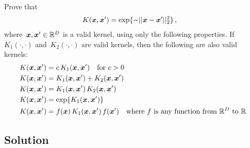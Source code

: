 \documentclass[submit]{harvardml}
\begin{document}
\newpage
\begin{problem}
Prove that
\begin{align*}
	K(\boldsymbol{x}, \boldsymbol{x}') &= \exp\{ -||\boldsymbol{x} - \boldsymbol{x}'||^2_2 \}\,,
\end{align*}
where~$\boldsymbol{x},\boldsymbol{x}'\in\mathbb{R}^D$ is a valid kernel, using only the following
properties.  If~$K_1(\cdot,\cdot)$ and~$K_2(\cdot,\cdot)$ are valid kernels,
then the following are also valid kernels:
\begin{align*}
	K(\boldsymbol{x}, \boldsymbol{x}') &= c\,K_1(\boldsymbol{x}, \boldsymbol{x}') \quad \text{for $c>0$}\\
	K(\boldsymbol{x}, \boldsymbol{x}') &= K_1(\boldsymbol{x}, \boldsymbol{x}') + K_2(\boldsymbol{x}, \boldsymbol{x}')\\
	K(\boldsymbol{x}, \boldsymbol{x}') &= K_1(\boldsymbol{x}, \boldsymbol{x}')\,K_2(\boldsymbol{x}, \boldsymbol{x}')\\
	K(\boldsymbol{x}, \boldsymbol{x}') &= \exp\{ K_1(\boldsymbol{x}, \boldsymbol{x}') \}\\
  K(\boldsymbol{x}, \boldsymbol{x}') &= f(\boldsymbol{x})\,K_1(\boldsymbol{x}, \boldsymbol{x}')\,f(\boldsymbol{x}') \quad
  \text{where $f$ is any function from~$\mathbb{R}^D$ to $\mathbb{R}$}
\end{align*}

 \end{problem}
\subsection*{Solution}
\end{document}
